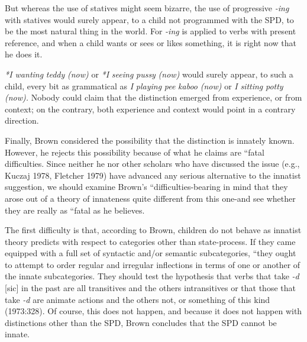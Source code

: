 But whereas the use of  statives might seem bizarre, the use of progressive \textit{{}-ing} with statives would surely appear, to a child not programmed with the SPD, to be the most natural thing in the world. For \textit{{}-ing} is applied to verbs with present reference, and when a child wants or sees or likes something, it is right now that he does it.

\textit{*I wanting} \textit{teddy} \textit{(now}\textit{)} or \textit{*I} \textit{seeing} \textit{pussy} \textit{(now}\textit{)} would surely appear, to such a child, every bit as grammatical as \textit{I} \textit{playing} \textit{pee} \textit{k}\textit{aboo} \textit{(now}\textit{)} or \textit{I} \textit{sitting} \textit{potty} \textit{(}\textit{now)}\textit{.} Nobody could claim that the distinction emerged from experience, or from context; on the contrary, both experience and context would point in a contrary direction.

Finally, Brown considered the possibility that the distinction is innately known. However, he rejects this possibility because of what he claims are ``fatal difficulties. Since neither he nor other scholars who have discussed the issue (e.g., Kuczaj 1978, Fletcher 1979) have advanced any serious alternative to the innatist suggestion, we should examine Brown's ``difficulties{\textquotedbl}{}-bearing in mind that they arose out of a theory of innateness quite different from this one-and see whether they are really as ``fatal as he believes.

The first difficulty is that, according to Brown, children do not behave as innatist theory predicts with respect to categories other than state-process. If they came equipped with a full set of syntactic and/or semantic subcategories, ``they ought to attempt to order regular and irregular inflections in terms of one or another of the innate subcate\-gories. They should test the hypothesis that verbs that take \textit{{}-d }[sic] in the past are all transitives and the others intransitives or that those that take \textit{{}-d} are animate actions and the others not, or something of this kind (1973:328). Of course, this does not happen, and because it does not happen with distinctions other than the SPD, Brown con\-cludes that the SPD cannot be innate.

